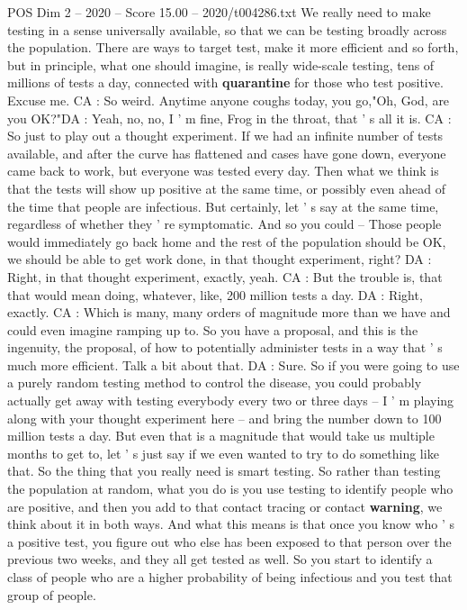 \begin{textsample}{POS Dim 2 – 2020 – Score 15.00 – 2020/t004286.txt}
We really need to make testing in a sense universally available, so that we can be testing broadly across the population.
There are ways to target test, make it more efficient and so forth, but in principle, what one should imagine, is really wide-scale testing, tens of millions of tests a day, connected with \textbf{quarantine} for those who test positive.
Excuse me.
CA : So weird.
Anytime anyone coughs today, you go,"Oh, God, are you OK?"DA : Yeah, no, no, I ' m fine, Frog in the throat, that ' s all it is.
CA : So just to play out a thought experiment.
If we had an infinite number of tests available, and after the curve has flattened and cases have gone down, everyone came back to work, but everyone was tested every day.
Then what we think is that the tests will show up positive at the same time, or possibly even ahead of the time that people are infectious.
But certainly, let ' s say at the same time, regardless of whether they ' re symptomatic.
And so you could -- Those people would immediately go back home and the rest of the population should be OK, we should be able to get work done, in that thought experiment, right?
DA : Right, in that thought experiment, exactly, yeah.
CA : But the trouble is, that that would mean doing, whatever, like, 200 million tests a day.
DA : Right, exactly.
CA : Which is many, many orders of magnitude more than we have and could even imagine ramping up to.
So you have a proposal, and this is the ingenuity, the proposal, of how to potentially administer tests in a way that ' s much more efficient.
Talk a bit about that.
DA : Sure.
So if you were going to use a purely random testing method to control the disease, you could probably actually get away with testing everybody every two or three days -- I ' m playing along with your thought experiment here -- and bring the number down to 100 million tests a day.
But even that is a magnitude that would take us multiple months to get to, let ' s just say if we even wanted to try to do something like that.
So the thing that you really need is smart testing.
So rather than testing the population at random, what you do is you use testing to identify people who are positive, and then you add to that contact tracing or contact \textbf{warning}, we think about it in both ways.
And what this means is that once you know who ' s a positive test, you figure out who else has been exposed to that person over the previous two weeks, and they all get tested as well.
So you start to identify a class of people who are a higher probability of being infectious and you test that group of people.

\end{textsample}
